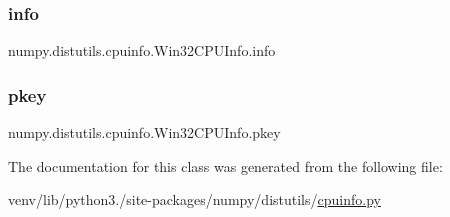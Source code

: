 \subsubsection{\texorpdfstring{info}{info}}
{\footnotesize\ttfamily numpy.\+distutils.\+cpuinfo.\+Win32\+C\+P\+U\+Info.\+info\hspace{0.3cm}{\ttfamily [static]}}

\mbox{\label{classnumpy_1_1distutils_1_1cpuinfo_1_1Win32CPUInfo_a7db62c6ca23a436aec869bca93e4628c}} 
\subsubsection{\texorpdfstring{pkey}{pkey}}
{\footnotesize\ttfamily numpy.\+distutils.\+cpuinfo.\+Win32\+C\+P\+U\+Info.\+pkey\hspace{0.3cm}{\ttfamily [static]}}



The documentation for this class was generated from the following file\+:\begin{DoxyCompactItemize}
\item 
venv/lib/python3./site-\/packages/numpy/distutils/\hyperlink{cpuinfo_8py}{cpuinfo.\+py}\end{DoxyCompactItemize}
